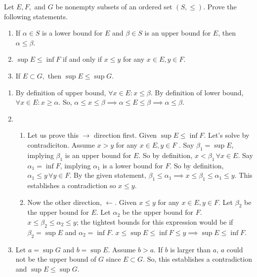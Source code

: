 \documentclass[12pt,letterpaper,boxed]{hmcpset}
\begin{document}
\begin{problem}[Exercise 1.6.]
Let $E, F,$ and $G$ be nonempty subsets of an ordered set $(S,\le).$ Prove the following statements. 
\vspace{-2mm}
\begin{enumerate}
	\itemsep0em
	\item If $\alpha\in S$ is a lower bound for $E$ and $\beta\in S$ is an upper bound for $E$, then $\alpha \le \beta$.
	\item $\sup E \leq \inf F$ if and only if $x \leq y$ for any $x\in E, y \in F.$
	\item If $E \subset G,$ then $\sup E \leq \sup G.$
\end{enumerate}
\end{problem}
\begin{solution}
\vspace{-2mm}
\begin{enumerate}
	\itemsep0em
	\item By definition of upper bound, $\forall x \in E : x \leq \beta$. By definition of lower bound, $\forall x \in E : x \ge \alpha.$ So, $\alpha \leq x \leq \beta \implies \alpha \leq E \leq \beta \implies \alpha \leq \beta.$
	\item 
	\begin{enumerate}
		\itemsep0em
		\item Let us prove this $\rightarrow$ direction first. Given $\sup E \leq \inf F$. Let's solve by contradiciton. Assume $x > y$ for any $x \in E, y \in F$ . Say $\beta_1 = \sup E$, implying $\beta_1$ is an upper bound for $E$. So by definition, $x < \beta_1 \, \forall x\in E.$ Say $\alpha_1 = \inf F$, implying $\alpha_1$ is a lower bound for $F$. So by definition, $\alpha_1 \le y \, \forall y\in F.$ By the given statement, $\beta_1\leq \alpha_1 \implies x \leq \beta_1 \leq \alpha_1 \leq y$. This establishes a contradiction so $x \leq y$.
		\item Now the other direction, $\leftarrow$. Given $x \leq y$ for any $x \in E, y \in F$. Let $\beta_2$ be the upper bound for $E$. Let $\alpha_2$ be the upper bound for $F$. $x \leq \beta_2 \leq \alpha_2\leq y$; the tightest bounds for this expression would be if $\beta_2=\sup E$ and $\alpha_2=\inf F.$ $x \leq \sup E \leq \inf F \leq y \implies \sup E \leq \inf F.$
	\end{enumerate}	
	\item Let $a = \sup G$ and $b = \sup E$. Assume $b > a.$ If $b$ is larger than $a$, $a$ could not be the upper bound of $G$ since $E \subset G.$ So, this establishes a contradiction and $\sup E \leq \sup G.$ 
\end{enumerate}
\end{solution}
\end{document}
